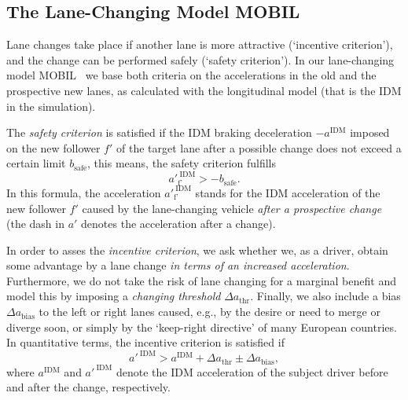 \documentclass[paper=A4,pagesize=auto,11pt]{scrartcl}
\providecommand{\gquote}[1]{`#1'}
\newcommand{\sub}[1]{_\text{#1}}
\newcommand{\assupIDM}{a'^{\ \text{IDM}}} %
\renewcommand{\sup}[1]{^{\text{#1}}}
\begin{document}
\subsection{The Lane-Changing Model MOBIL}\label{sec:MOBIL}
%
Lane changes take place if another lane is more
attractive (\gquote{incentive criterion}), and the
change can be performed safely (\gquote{safety criterion}). In our
lane-changing model MOBIL~\cite{MOBIL-TRR07} we 
base both criteria on the accelerations in the old and the prospective
new lanes, as calculated with the longitudinal model (that is the IDM
in the simulation).  

The \textit{safety criterion} is satisfied if the IDM braking
deceleration $-a\sup{IDM}$ imposed on the new follower $f'$ of the
target lane after a possible change does not exceed a certain limit
$b\sub{safe}$, this means, the safety criterion fulfills 
\begin{equation}
\assupIDM\sub{f'} > - b\sub{safe}.
\end{equation}
In this formula, the acceleration $\assupIDM\sub{f'}$ stands for the
IDM acceleration of the new follower $f'$ caused by the lane-changing
vehicle \emph{after a prospective change} (the dash in $a'$ denotes the
acceleration after a change).

In order to asses the \textit{incentive criterion}, we ask whether
we, as a driver, obtain some advantage by a lane change \emph{in terms of
an increased 
acceleration}. Furthermore, we do not take the risk
of lane changing for a marginal benefit and model this by
 imposing a \emph{changing
  threshold} $\Delta a\sub{thr}$. Finally, we also include a bias $\Delta
a\sub{bias}$ to the left or
right lanes caused, e.g., by the desire or need to merge or diverge soon, or
simply by the \gquote{keep-right directive} of many European
countries. In quantitative terms, the incentive criterion is satisfied
if 
\begin {equation}
\assupIDM> a\sup{IDM} + \Delta a\sub{thr} \pm \Delta a\sub{bias},
\end{equation}
where $a\sup{IDM}$ and $\assupIDM$ denote the IDM acceleration of
the subject driver before and after the change, respectively.



\renewcommand{\entry}[3]{ 
  \parbox{47mm}{\vspace*{1mm}#1\vspace*{1mm}}
  &\parbox{18mm}{\vspace*{1mm}\centering #2\vspace*{1mm}} 
  &\parbox{76mm}{\vspace*{1mm}#3\vspace*{1mm}}}
\end{document}
